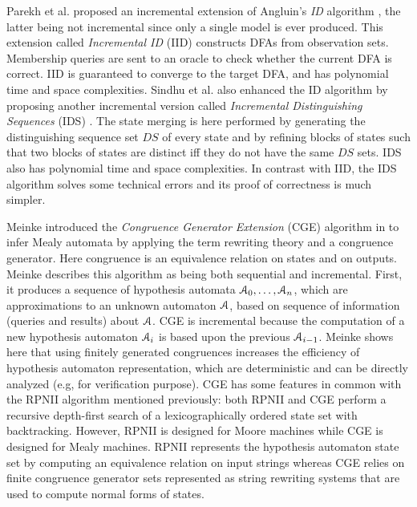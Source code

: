 Parekh et al. \cite{parekh98} proposed an incremental extension
of Angluin's \textit{ID} algorithm \cite{ANGLUIN198176}, the
latter being not incremental since only a single model is
ever produced. This extension called \textit{Incremental ID}
(IID) constructs DFAs from observation sets. Membership queries
are sent to an oracle to check whether the current DFA is
correct. IID is guaranteed to converge to the target DFA, and has
polynomial time and space complexities. Sindhu et al. also
enhanced the ID algorithm by proposing another incremental
version called \textit{Incremental Distinguishing Sequences}
(IDS) \cite{journals/corr/abs-1206-2691}. The state merging is
here performed by generating the distinguishing sequence set $DS$
of every state and by refining blocks of states such that two
blocks of states are distinct iff they do not have the same $DS$
sets. IDS also has polynomial time and space complexities. In
contrast with IID, the IDS algorithm solves some technical errors
and its proof of correctness is much simpler.

Meinke introduced the \textit{Congruence Generator Extension}
(CGE) algorithm in \cite{meinkeCGE} to infer Mealy automata by
applying the term rewriting theory and a congruence generator.
Here congruence is an equivalence relation on states and on
outputs. Meinke describes this algorithm as being both sequential
and incremental. First, it produces a sequence of hypothesis
automata $\EuScript{A}_0, \dots, \EuScript{A}_n$, which are
approximations to an unknown automaton $\EuScript{A}$, based on
sequence of information (queries and results) about
$\EuScript{A}$. CGE is incremental because the computation
of a new hypothesis automaton $\EuScript{A}_i$ is based upon the
previous $\EuScript{A}_{i-1}$. Meinke shows here that using
finitely generated congruences increases the efficiency of
hypothesis automaton representation, which are deterministic
and can be directly analyzed (e.g, for verification purpose). CGE
has some features in common with the RPNII algorithm mentioned
previously: both RPNII and CGE perform a recursive depth-first
search of a lexicographically ordered state set with
backtracking. However, RPNII is designed for Moore machines while
CGE is designed for Mealy machines. RPNII represents the
hypothesis automaton state set by computing an equivalence
relation on input strings whereas CGE relies on finite congruence
generator sets represented as string rewriting systems that are
used to compute normal forms of states.

